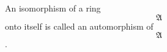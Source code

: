 An isomorphism of a ring $$\mathfrak{A}$$ onto itself is called an automorphism of $$\mathfrak{A}$$.
